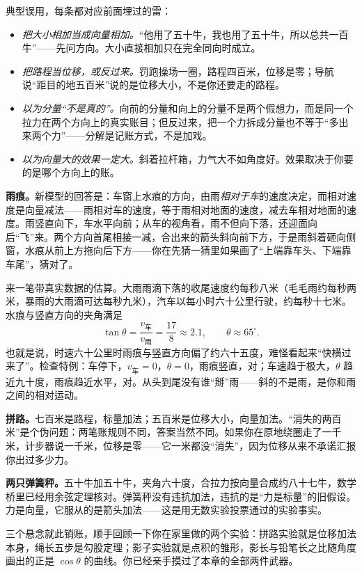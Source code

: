 典型误用，每条都对应前面埋过的雷：

\begin{itemize}[leftmargin=1.8em]
  \item \emph{把大小相加当成向量相加。}“他用了五十牛，我也用了五十牛，所以总共一百牛”——先问方向。大小直接相加只在完全同向时成立。
  \item \emph{把路程当位移，或反过来。}罚跑操场一圈，路程四百米，位移是零；导航说“距目的地五百米”说的是位移大小，不是你还要走的路程。
  \item \emph{以为分量“不是真的”。}向前的分量和向上的分量不是两个假想力，而是同一个拉力在两个方向上的真实账目；但反过来，把一个力拆成分量也不等于“多出来两个力”——分解是记账方式，不是加戏。
  \item \emph{以为向量大的效果一定大。}斜着拉杆箱，力气大不如角度好。效果取决于你要的是哪个方向上的账。
\end{itemize}


\textbf{雨痕。}新模型的回答是：车窗上水痕的方向，由雨\emph{相对于车}的速度决定，而相对速度是向量减法——雨相对车的速度，等于雨相对地面的速度，减去车相对地面的速度。雨竖直向下，车水平向前；从车的视角看，雨不但向下落，还迎面向后“飞”来。两个方向首尾相接一减，合出来的箭头斜向前下方，于是雨斜着砸向侧窗，水痕从前上方拖向后下方——你在先猜一猜里如果画了“上端靠车头、下端靠车尾”，猜对了。

来一笔带真实数据的估算。大雨雨滴下落的收尾速度约每秒八米（毛毛雨约每秒两米，暴雨的大雨滴可达每秒九米），汽车以每小时六十公里行驶，约每秒十七米。水痕与竖直方向的夹角满足
\[
  \tan\theta=\frac{v_{\text{车}}}{v_{\text{雨}}}=\frac{17}{8}\approx 2.1,
  \qquad \theta\approx 65^{\circ} .
\]
也就是说，时速六十公里时雨痕与竖直方向偏了约六十五度，难怪看起来“快横过来了”。检查特例：车停下，\(v_{\text{车}}=0\)，\(\theta=0\)，雨痕竖直，对；车速趋于极大，\(\theta\) 趋近九十度，雨痕趋近水平，对。从头到尾没有谁“掰”雨——斜的不是雨，是你和雨之间的相对运动。

\textbf{拼路。}七百米是路程，标量加法；五百米是位移大小，向量加法。“消失的两百米”是个伪问题：两笔账规则不同，答案当然不同。如果你在原地绕圈走了一千米，计步器说一千米，位移是零——它一米都没“消失”，因为位移从来不承诺汇报你出过多少力。

\textbf{两只弹簧秤。}五十牛加五十牛，夹角六十度，合拉力按向量合成约八十七牛，数学桥里已经用余弦定理核对。弹簧秤没有违抗加法，违抗的是“力是标量”的旧假设。力是向量，它服从的是箭头加法——这是用无数实验投票通过的实验事实。

三个悬念就此销账，顺手回顾一下你在家里做的两个实验：拼路实验就是位移加法本身，绳长五步是勾股定理；影子实验就是点积的雏形，影长与铅笔长之比随角度画出的正是 \(\cos\theta\) 的曲线。你已经亲手摸过了本章的全部两件武器。


